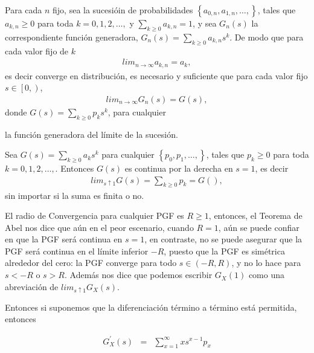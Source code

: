 \begin{Teo}
Para cada $n$ fijo, sea la sucesi\'oin de probabilidades
$\left\{a_{0,n},a_{1,n},\ldots,\right\}$, tales que $a_{k,n}\geq0$
para toda $k=0,1,2,\ldots,$ y $\sum_{k\geq0}a_{k,n}=1$, y sea
$G_{n}\left(s\right)$ la correspondiente funci\'on generadora,
$G_{n}\left(s\right)=\sum_{k\geq0}a_{k,n}s^{k}$. De modo que para
cada valor fijo de $k$
\begin{eqnarray*}
lim_{n\rightarrow\infty}a_{k,n}=a_{k},
\end{eqnarray*}
es decir converge en distribuci\'on, es necesario y suficiente que
para cada valor fijo $s\in\left[0,\right)$,
\begin{eqnarray*}
lim_{n\rightarrow\infty}G_{n}\left(s\right)=G\left(s\right),
\end{eqnarray*}
donde $G\left(s\right)=\sum_{k\geq0}p_{k}s^{k}$, para cualquier

la funci\'on generadora del l\'imite de la sucesi\'on.
\end{Teo}

\begin{Teo}
Sea $G\left(s\right)=\sum_{k\geq0}a_{k}s^{k}$ para cualquier
$\left\{p_{0},p_{1},\ldots,\right\}$, tales que $p_{k}\geq0$ para
toda $k=0,1,2,\ldots,$. Entonces $G\left(s\right)$ es continua por
la derecha en $s=1$, es decir
\begin{eqnarray*}
lim_{s\uparrow1}G\left(s\right)=\sum_{k\geq0}p_{k}=G\left(\right),
\end{eqnarray*}
sin importar si la suma es finita o no.
\end{Teo}
\begin{Note}
El radio de Convergencia para cualquier PGF es $R\geq1$, entonces,
el Teorema de Abel nos dice que a\'un en el peor escenario, cuando
$R=1$, a\'un se puede confiar en que la PGF ser\'a continua en
$s=1$, en contraste, no se puede asegurar que la PGF ser\'a
continua en el l\'imite inferior $-R$, puesto que la PGF es
sim\'etrica alrededor del cero: la PGF converge para todo
$s\in\left(-R,R\right)$, y no lo hace para $s<-R$ o $s>R$.
Adem\'as nos dice que podemos escribir $G_{X}\left(1\right)$ como
una abreviaci\'on de $lim_{s\uparrow1}G_{X}\left(s\right)$.
\end{Note}

Entonces si suponemos que la diferenciaci\'on t\'ermino a
t\'ermino est\'a permitida, entonces

\begin{eqnarray*}
G_{X}^{'}\left(s\right)&=&\sum_{x=1}^{\infty}xs^{x-1}p_{x}
\end{eqnarray*}

